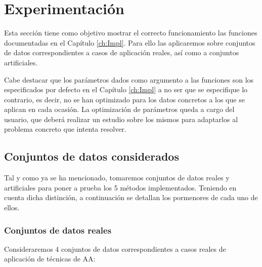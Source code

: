 \chapter{Experimentación}\label{ch:Experimentación}

Esta sección tiene como objetivo mostrar el correcto funcionamiento las funciones documentadas en el Capítulo \ref{ch:Impl}. Para ello las aplicaremos sobre conjuntos de datos correspondientes a casos de aplicación reales, así como a conjuntos artificiales.

Cabe destacar que los parámetros dados como argumento a las funciones son los especificados por defecto en el Capítulo \ref{ch:Impl} a no ser que se especifique lo contrario, es decir, no se han optimizado para los datos concretos a los que se aplican en cada ocasión. La optimización de parámetros queda a cargo del usuario, que deberá realizar un estudio sobre los mismos para adaptarlos al problema concreto que intenta resolver.

\section{Conjuntos de datos considerados} \label{datasets}

Tal y como ya se ha mencionado, tomaremos conjuntos de datos reales y artificiales para poner a prueba los 5 métodos implementados. Teniendo en cuenta dicha distinción, a continuación se detallan los pormenores de cada uno de ellos.

\subsection{Conjuntos de datos reales}

Consideraremos 4 conjuntos de datos correspondientes a casos reales de aplicación de técnicas de \acf{AA}:

